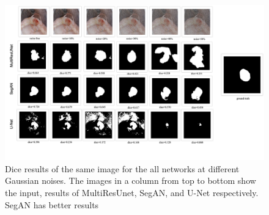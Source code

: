 \begin{figure}
    \centerline{\includegraphics[width=1\columnwidth]{05-results/figures/extended_results_sample_gan_over_unet.png}}
    \caption{Dice results of the same image for the all networks at different Gaussian noises. The images in a column from top to bottom show the input, results of MultiResUnet, SegAN, and U-Net respectively. SegAN has better results}
    \label{figure:all-noises-with-results-dice-segan-over-multiresunet}
\end{figure}

